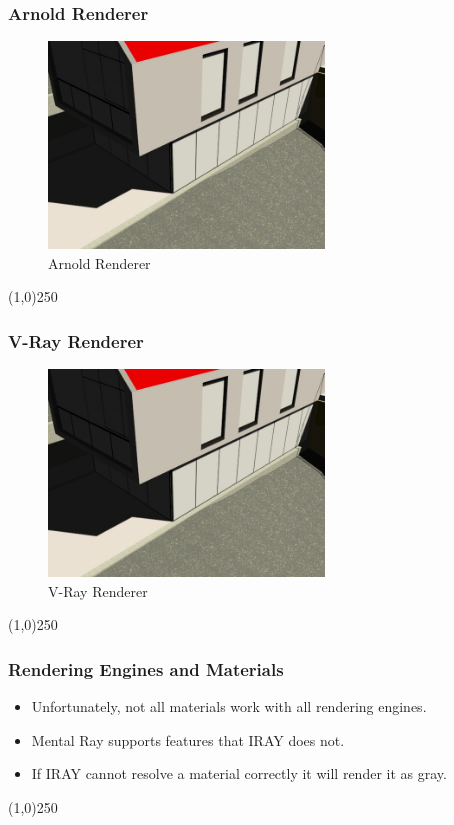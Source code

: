 \begin{frame}
\frametitle{Arnold Renderer}
\begin{figure}
	\centering
	\includegraphics[height=5.5cm]{img/RenderEngine/Revit3DSScanLine.jpg}
	\caption{Arnold Renderer}
	\label{fig:ArnoldRenderer}
\end{figure}
\end{frame}
\begin{center}\line(1,0){250}\end{center}

\begin{frame}
\frametitle{V-Ray Renderer}
\begin{figure}
	\centering
	\includegraphics[height=5.5cm]{img/RenderEngine/Revit3DSScanLine.jpg}
	\caption{V-Ray Renderer}
	\label{fig:V-RayRenderer}
\end{figure}
\end{frame}
\begin{center}\line(1,0){250}\end{center}




\begin{frame}
\frametitle{Rendering Engines and Materials}
\begin{itemize}
	\item Unfortunately, not all materials work with all rendering engines.
	\item Mental Ray supports features that IRAY does not.
	\item If IRAY cannot resolve a material correctly it will render it as gray.
\end{itemize}
\end{frame}
\begin{center}\line(1,0){250}\end{center}


